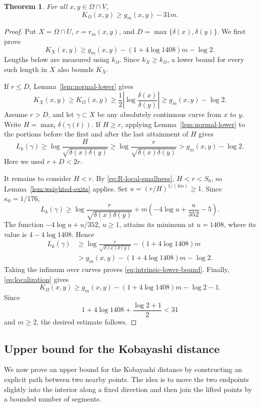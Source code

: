 \documentclass[11pt]{article}
\newtheorem{theorem}{Theorem}[section]
\theoremstyle{definition}
\begin{document}
\begin{theorem}\label{thm:lower-bound}
For all \(x,y\in\Omega\cap V\),
\[
K_\Omega(x,y)\ge g_m(x,y)-31m.
\]
\end{theorem}
\begin{proof}
Put \(X=\Omega\cap U\), \(r=r_m(x,y)\), and
\(D=\max\{\delta(x),\delta(y)\}\). We first prove
\begin{equation}\label{eq:intrinsic-lower-bound}
K_X(x,y)\ge
g_m(x,y)-(1+4\log1408)m-\log2.
\end{equation}
Lengths below are measured using \(k_\Omega\). Since \(k_X\ge k_\Omega\),
a lower bound for every such length in \(X\) also bounds \(K_X\).

If \(r\le D\), Lemma~\ref{lem:normal-lower} gives
\[
K_X(x,y)\ge K_\Omega(x,y)
\ge\frac12\left|\log\frac{\delta(x)}{\delta(y)}\right|
\ge g_m(x,y)-\log2.
\]
Assume \(r>D\), and let \(\gamma\subset X\) be any absolutely
continuous curve from \(x\) to \(y\). Write
\(H=\max_t\delta(\gamma(t))\).
If \(H\ge r\), applying Lemma~\ref{lem:normal-lower} to the portions
before the first and after the last attainment of \(H\) gives
\[
L_k(\gamma)\ge
\log\frac{H}{\sqrt{\delta(x)\delta(y)}}
\ge\log\frac r{\sqrt{\delta(x)\delta(y)}}
>g_m(x,y)-\log2.
\]
Here we used \(r+D<2r\).

It remains to consider \(H<r\). By \eqref{eq:R-local-smallness},
\(H<r<S_0\), so Lemma~\ref{lem:weighted-exits} applies. Set
\(u=(r/H)^{1/(4m)}\ge1\). Since \(\kappa_0=1/176\),
\[
L_k(\gamma)\ge
\log\frac r{\sqrt{\delta(x)\delta(y)}}
+m\left(-4\log u+\frac u{352}-5\right).
\]
The function \(-4\log u+u/352\), \(u\ge1\), attains its minimum at
\(u=1408\), where its value is \(4-4\log1408\). Hence
\[
\begin{aligned}
L_k(\gamma)
&\ge\log\frac r{\sqrt{\delta(x)\delta(y)}}
-(1+4\log1408)m\\
&>g_m(x,y)-(1+4\log1408)m-\log2.
\end{aligned}
\]
Taking the infimum over curves proves \eqref{eq:intrinsic-lower-bound}.
Finally, \eqref{eq:localization} gives
\[
K_\Omega(x,y)\ge
g_m(x,y)-(1+4\log1408)m-\log2-1.
\]
Since
\[
1+4\log1408+\frac{\log2+1}{2}<31
\]
and \(m\ge2\), the desired estimate follows.
\end{proof}

\subsection{Upper bound for the Kobayashi distance}
We now prove an upper bound for the Kobayashi distance by constructing
an explicit path between two nearby points.  The idea is to move the
two endpoints slightly into the interior along a fixed direction and
then join the lifted points by a bounded number of segments.
\end{document}
